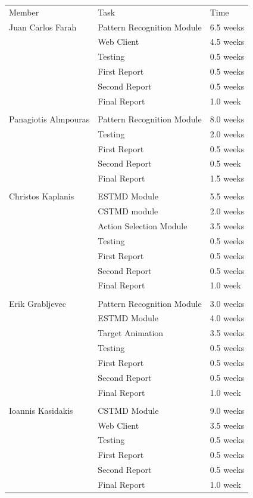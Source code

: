 \documentclass[a4paper,11pt]{article}
\begin{document}
\begin{table}[h]
\centering
\begin{tabular}{|l|l|l|}
\cline{1-3}
Member& Task&  Time  \\ \cline{1-3}
 Juan Carlos Farah&  Pattern Recognition Module&  6.5 weeks  \\ \cline{1-3}
&  Web Client&  4.5 weeks  \\ \cline{1-3}
& Testing& 0.5 weeks \\ \cline{1-3}
&  First Report&  0.5 weeks  \\ \cline{1-3}
&  Second Report&  0.5 weeks  \\ \cline{1-3}
&  Final Report& 1.0 week   \\ \cline{1-3}
&  &    \\ \cline{1-3}
Panagiotis Almpouras&  Pattern Recognition Module& 8.0 weeks  \\ \cline{1-3}
&  Testing&  2.0 weeks  \\ \cline{1-3}
&  First Report&  0.5 weeks  \\ \cline{1-3}
&  Second Report&  0.5 week  \\ \cline{1-3}
&  Final Report&  1.5 weeks  \\ \cline{1-3}
&  &    \\ \cline{1-3}
 Christos Kaplanis&  ESTMD Module&  5.5 weeks  \\ \cline{1-3}
&  CSTMD module& 2.0 weeks    \\ \cline{1-3}
&  Action Selection Module&  3.5 weeks  \\ \cline{1-3}
& Testing& 0.5 weeks \\ \cline{1-3}
&  First Report&  0.5 weeks  \\ \cline{1-3}
&  Second Report&  0.5 weeks  \\ \cline{1-3}
&  Final Report&  1.0 week  \\ \cline{1-3}
&  &   \\ \cline{1-3}
Erik Grabljevec&  Pattern Recognition Module&  3.0 weeks  \\ \cline{1-3}
&  ESTMD Module&  4.0 weeks  \\ \cline{1-3}
&  Target Animation&  3.5 weeks  \\ \cline{1-3}
& Testing& 0.5 weeks \\ \cline{1-3}
&  First Report& 0.5 weeks  \\ \cline{1-3}
&  Second Report&  0.5 weeks  \\ \cline{1-3}
&  Final Report&  1.0 week  \\ \cline{1-3}
&  &   \\ \cline{1-3}
Ioannis Kasidakis& CSTMD Module& 9.0 weeks  \\ \cline{1-3}
&  Web Client & 3.5 weeks    \\ \cline{1-3}
& Testing& 0.5 weeks \\ \cline{1-3}
&  First Report& 0.5 weeks     \\ \cline{1-3}
&  Second Report& 0.5 weeks   \\ \cline{1-3}
&  Final Report& 1.0 week   \\ \cline{1-3}

\end{tabular}
\end{table}
\end{document}
